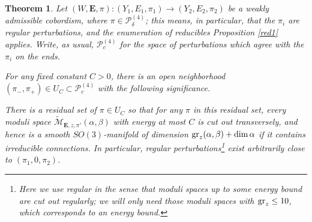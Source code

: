 \documentclass[10pt,a4paper]{amsart}
\newtheorem{theorem}{Theorem}
\theoremstyle{definition}
\theoremstyle{remark}
\numberwithin{figure}{qchap}
\begin{document}
\begin{theorem}\label{trans3}Let $(W,\mathbf{E},\pi): (Y_1, E_1,\pi_1) \to (Y_2, E_2,\pi_2)$ be a weakly admissible cobordism, where $\pi \in \mathcal P^{(4)}_\delta$; this means, in particular, that the $\pi_i$ are regular perturbations, and the enumeration of reducibles Proposition \ref{red1} applies. Write, as usual, $\mathcal P^{(4)}_c$ for the space of perturbations which agree with the $\pi_i$ on the ends.

For any fixed constant $C > 0$, there is an open neighborhood $(\pi_-, \pi_+) \in U_C \subset \mathcal P^{(4)}_c$ with the following significance.

There is a residual set of $\pi \in U_C$ so that for any $\pi$ in this residual set, every moduli space $\widetilde{\mathcal M}_{\mathbf{E},z,\pi'}(\alpha, \beta)$ with energy at most $C$ is cut out transversely, and hence is a smooth $SO(3)$-manifold of dimension $\textup{gr}_z(\alpha, \beta) + \dim \alpha$ if it contains irreducible connections. In particular, regular perturbations\footnote{Here we use regular in the sense that moduli spaces up to some energy bound are cut out regularly; we will only need those moduli spaces with $\textup{gr}_z \leq 10$, which corresponds to an energy bound.} exist arbitrarily close to $(\pi_1, 0, \pi_2)$.
\end{theorem}
\end{document}
